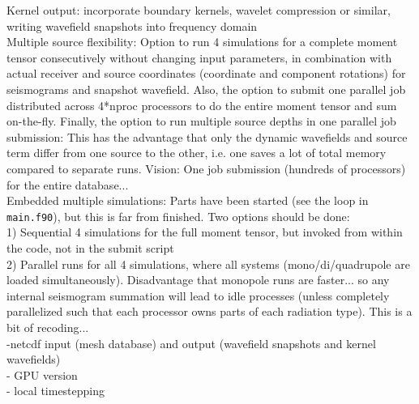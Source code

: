 \documentclass[11pt,letter,fleqn,english,notitlepage]{article}
\begin{document}
\noindent Kernel output: incorporate boundary kernels, wavelet compression or similar, writing wavefield snapshots into
frequency domain\\

\noindent Multiple source flexibility: Option to run 4 simulations for a complete moment tensor 
consecutively without changing input parameters, in combination with 
actual receiver and source coordinates (coordinate and component rotations) for seismograms and snapshot wavefield. 
Also, the option to submit one parallel job distributed across 4*nproc processors to do the entire moment tensor and 
sum on-the-fly. Finally, the option to run multiple source depths in one parallel job submission: This has the advantage 
that only the dynamic wavefields and source term differ from one source to the other, i.e. one saves a lot of total memory 
compared to separate runs. Vision: One job submission (hundreds of processors) for the entire database...\\

\noindent Embedded multiple simulations: Parts have been started (see the loop in {\tt main.f90}), but this is far from finished. 
  Two options should be done: \\
        1) Sequential 4 simulations for the full moment tensor, but invoked from within the code, not in the submit script\\
        2) Parallel runs for all 4 simulations, where all systems (mono/di/quadrupole are loaded simultaneously). Disadvantage that 
            monopole runs are faster... so any internal seismogram summation will lead to idle processes (unless completely parallelized such that each processor owns parts of each radiation type). This is a bit of recoding...\\

-netcdf input (mesh database) and output (wavefield snapshots and kernel wavefields)\\

- GPU version\\

- local timestepping

\newpage
\end{document}
